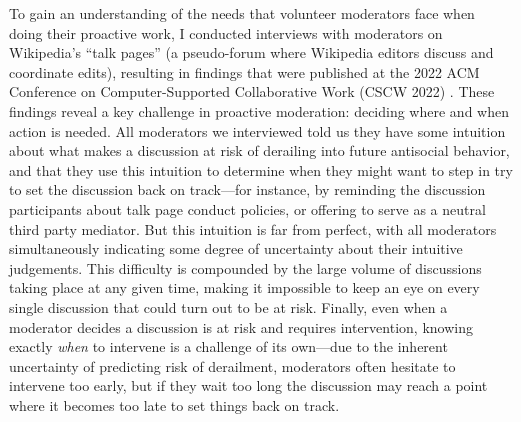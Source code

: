 \documentclass[11pt,letterpaper]{article}
\begin{document}

To gain an understanding of the needs that volunteer moderators face when doing their proactive work, I conducted interviews with moderators on Wikipedia's ``talk pages'' (a pseudo-forum where Wikipedia editors discuss and coordinate edits), resulting in findings that were published at the 2022 ACM Conference on Computer-Supported Collaborative Work (CSCW 2022) \cite{schluger_proactive_2022}.
These findings reveal a key challenge in proactive moderation: deciding where and when action is needed.
All moderators we interviewed told us they have some intuition about what makes a discussion at risk of derailing into future antisocial behavior, and that they use this intuition to determine when they might want to step in try to set the discussion back on track---for instance, by reminding the discussion participants about talk page conduct policies, or offering to serve as a neutral third party mediator.
But this intuition is far from perfect, with all moderators simultaneously indicating some degree of uncertainty about their intuitive judgements.
This difficulty is compounded by the large volume of discussions taking place at any given time, making it impossible to keep an eye on every single discussion that could turn out to be at risk.
Finally, even when a moderator decides a discussion is at risk and requires intervention, knowing exactly \emph{when} to intervene is a challenge of its own---due to the inherent uncertainty of predicting risk of derailment, moderators often hesitate to intervene too early, but if they wait too long the discussion may reach a point where it becomes too late to set things back on track.%
\end{document}
